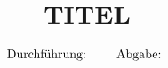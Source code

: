 

\subject{VERSUCH NUMMER}
\title{TITEL}

\date{
  \begin{align}
    &\text{Durchführung: } & \hspace{-2em} \text{} & \hspace{2em} & \text{Abgabe: } \notag
  \end{align}
}



\maketitle
\thispagestyle{empty}
\tableofcontents
\newpage






\nocite{*}
\printbibliography{}


